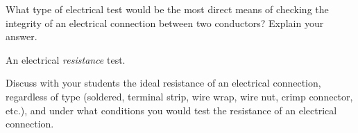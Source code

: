 

What type of electrical test would be the most direct means of checking the integrity of an electrical connection between two conductors?  Explain your answer.







An electrical {\it resistance} test.







Discuss with your students the ideal resistance of an electrical connection, regardless of type (soldered, terminal strip, wire wrap, wire nut, crimp connector, etc.), and under what conditions you would test the resistance of an electrical connection.




